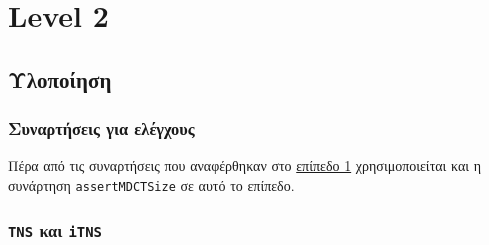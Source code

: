 \section{Level 2}
\subsection{Υλοποίηση}
\subsubsection{Συναρτήσεις για ελέγχους}\label{sub:asserts2}
Πέρα από τις συναρτήσεις που αναφέρθηκαν στο \hyperref[sub:asserts1]{επίπεδο 1} χρησιμοποιείται και η συνάρτηση \texttt{assertMDCTSize} σε αυτό το επίπεδο.

\subsubsection{\texttt{TNS} και \texttt{iTNS}}
